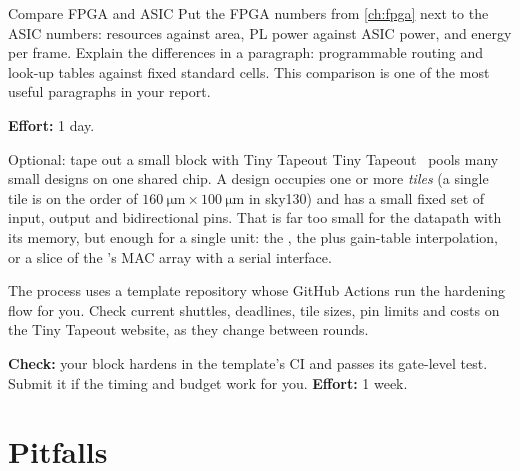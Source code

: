 \begin{stepbox}[label=st:asic:compare]{Compare FPGA and ASIC}
Put the FPGA numbers from \cref{ch:fpga} next to the ASIC numbers: resources
against area, PL power against ASIC power, and energy per frame. Explain the
differences in a paragraph: programmable routing and look-up tables against
fixed standard cells. This comparison is one of the most useful paragraphs in
your report.

\textbf{Effort:} 1 day.
\end{stepbox}

\begin{stepbox}[label=st:asic:tt]{Optional: tape out a small block with Tiny Tapeout}
Tiny Tapeout~\cite{tinytapeout} pools many small designs on one shared chip.
A design occupies one or more \emph{tiles} (a single tile is on the order of
$\qty{160}{\micro\m}\times\qty{100}{\micro\m}$ in sky130) and has a small fixed
set of input, output and bidirectional pins. That is far too small for the
datapath with its memory, but enough for a single unit: the
, the  plus gain-table interpolation, or a
slice of the 's MAC array with a serial interface.

The process uses a template repository whose GitHub Actions run the hardening
flow for you. Check current shuttles, deadlines, tile sizes, pin limits and
costs on the Tiny Tapeout website, as they change between rounds.

\textbf{Check:} your block hardens in the template's CI and passes its
gate-level test. Submit it if the timing and budget work for you.
\textbf{Effort:} 1 week.
\end{stepbox}

\section{Pitfalls}\label{sec:asic:pitfalls}

